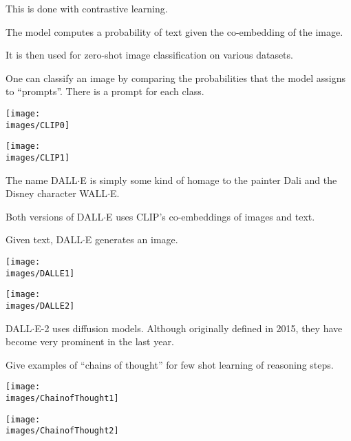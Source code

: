 {\vfill
This is done with contrastive learning.


The model computes a probability of text given the co-embedding of the image.

\vfill
It is then used for zero-shot image classification on various datasets.

\vfill
One can classify an image by comparing the probabilities that the model assigns to ``prompts''.  There is a prompt for each class.


\centerline{\texttt{[image: \\images/CLIP0]}}


\centerline{\texttt{[image: \\images/CLIP1]}}



The name DALL$\cdot$E is simply some kind of homage to the painter Dali and the Disney character WALL$\cdot$E.

\vfill
Both versions of DALL$\cdot$E uses CLIP's co-embeddings of images and text.

\vfill
Given text, DALL$\cdot$E generates an image.


\centerline{\texttt{[image: \\images/DALLE1]}}


\centerline{\texttt{[image: \\images/DALLE2]}}


DALL$\cdot$E-2 uses diffusion models.  Although originally defined in 2015, they have become very prominent in the last year.


Give examples of ``chains of thought'' for few shot learning of reasoning steps.


\centerline{\texttt{[image: \\images/ChainofThought1]}}


\centerline{\texttt{[image: \\images/ChainofThought2]}}

}
